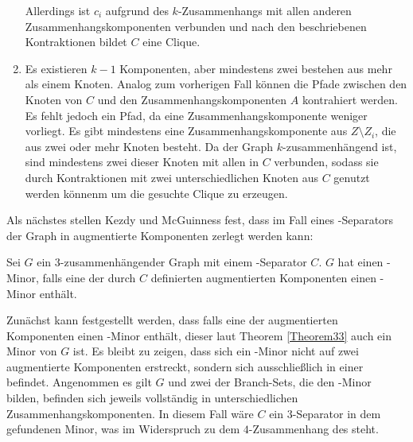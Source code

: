 \begin{beweis}
\begin{enumerate}
          Allerdings ist $c_i$ aufgrund des $k$-Zusammenhangs mit allen anderen Zusammenhangskomponenten verbunden und nach den beschriebenen Kontraktionen bildet $C$ eine Clique.
    \item Es existieren $k-1$ Komponenten, aber mindestens zwei bestehen aus mehr als einem Knoten.
          Analog zum vorherigen Fall können die Pfade zwischen den Knoten von $C$ und den Zusammenhangskomponenten $A$ kontrahiert werden.
          Es fehlt jedoch ein Pfad, da eine Zusammenhangskomponente weniger vorliegt.
          Es gibt mindestens eine Zusammenhangskomponente aus $Z \setminus Z_i$, die aus zwei oder mehr Knoten besteht.
          Da der Graph $k$-zusammenhängend ist, sind mindestens zwei dieser Knoten mit allen in $C$ verbunden, sodass sie durch Kontraktionen mit zwei unterschiedlichen Knoten aus $C$ genutzt werden könnenm um die gesuchte Clique zu erzeugen.
  \end{enumerate}
\end{beweis}

Als nächstes stellen Kezdy und McGuinness fest, dass im Fall eines \dd-Separators der Graph in augmentierte Komponenten zerlegt werden kann:
\begin{theorem}\label{Theorem34}
  Sei $G$ ein $3$-zusammenhängender Graph mit einem \dd-Separator $C$.
  $G$ hat einen \kf-Minor, falls eine der durch $C$ definierten augmentierten Komponenten einen \kf-Minor enthält.
\end{theorem}
\begin{beweis}
  Zunächst kann festgestellt werden, dass falls eine der augmentierten Komponenten einen \kf-Minor enthält, dieser laut Theorem \ref{Theorem33} auch ein Minor von $G$ ist.
  Es bleibt zu zeigen, dass sich ein \kf-Minor nicht auf zwei augmentierte Komponenten erstreckt, sondern sich ausschließlich in einer befindet.
  Angenommen es gilt \kf \minor $G$ und zwei der Branch-Sets, die den \kf-Minor bilden, befinden sich jeweils vollständig in unterschiedlichen Zusammenhangskomponenten.
  In diesem Fall wäre $C$ ein $3$-Separator in dem gefundenen Minor, was im Widerspruch zu dem $4$-Zusammenhang des \kf steht.
\end{beweis}

